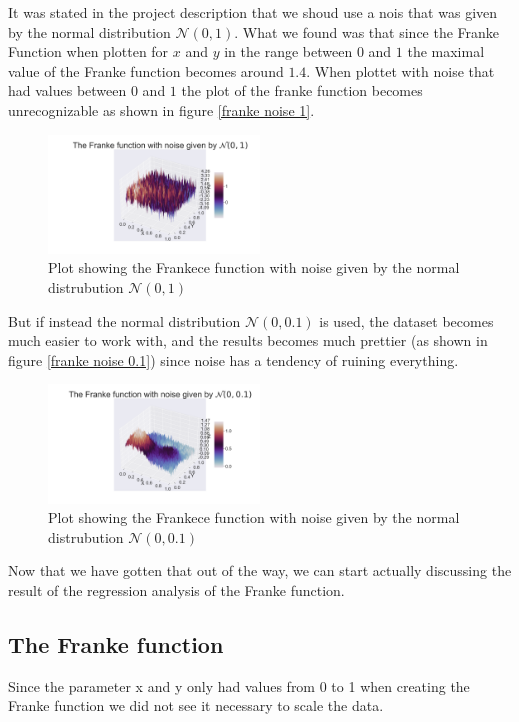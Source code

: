 \thispagestyle{plain}
\noindent It was stated in the project description that we shoud use a nois that was given by
the normal distribution $\mathcal{N}(0,1)$. What we found was that since the Franke
Function when plotten for $x$ and $y$ in the range between $0$ and $1$ the maximal 
value of the Franke function becomes around $1.4$. When plottet with noise that had values
between $0$ and $1$ the plot of the franke function becomes unrecognizable as shown in figure \eqref{franke noise 1}. 
\begin{figure}[H]
	\centering
	\includegraphics[width=0.5\textwidth]{Figure_13.png}
	\caption{Plot showing the Frankece function with noise given by the normal distrubution $\mathcal{N}(0,1)$ }
	\label{franke noise 1}
\end{figure}
\noindent But if instead the normal distribution $\mathcal{N}(0,0.1)$ is 
used, the dataset becomes much easier to work with, and the results becomes 
much prettier (as shown in figure \eqref{franke noise 0.1}) since noise has a tendency of ruining everything.
\begin{figure}[H]
	\centering
	\includegraphics[width=0.5\textwidth]{Figure_14.png}
	\caption{Plot showing the Frankece function with noise given by the normal distrubution $\mathcal{N}(0,0.1)$ }
	\label{franke noise 0.1}
\end{figure}
\noindent Now that we have gotten that out of the way, we can start actually
discussing the result of the regression analysis of the Franke function.

\subsection*{The Franke function}
\noindent Since the parameter x and y only had values from 0 to 1 when creating the 
Franke function we did not see it necessary to scale the data.

